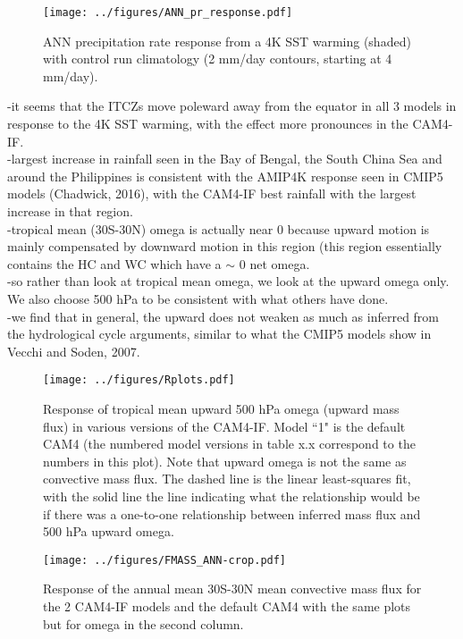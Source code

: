 \documentclass[letterpaper,12pt,titlepage,oneside,final]{book}
\begin{document}
\begin{figure}[H]
\centering
\noindent\texttt{[image: ../figures/ANN\_pr\_response.pdf]}\hfill
\caption{ANN precipitation rate response from a 4K SST warming (shaded) with control run climatology (2 mm/day contours, starting at 4 mm/day).}
\end{figure}
-it seems that the ITCZs move poleward away from the equator in all 3 models in response to the 4K SST warming, with the effect more pronounces in the CAM4-IF.
\\
-largest increase in rainfall seen in the Bay of Bengal, the South China Sea and around the Philippines is consistent with the AMIP4K response seen in CMIP5 models (Chadwick, 2016), with the CAM4-IF best rainfall with the largest increase in that region.
\\
-tropical mean (30S-30N) omega is actually near 0 because upward motion is mainly compensated by downward motion in this region (this region essentially contains the HC and WC which have a $\sim$ 0 net omega.
\\
-so rather than look at tropical mean omega, we look at the upward omega only. We also choose 500 hPa to be consistent with what others have done.
\\
-we find that in general, the upward does not weaken as much as inferred from the hydrological cycle arguments, similar to what the CMIP5 models show in Vecchi and Soden, 2007.
\begin{figure}[H]
\centering
\noindent\texttt{[image: ../figures/Rplots.pdf]}\hfill
\caption{Response of tropical mean upward 500 hPa omega (upward mass flux) in various versions of the CAM4-IF. Model ``1" is the default CAM4 (the numbered model versions in table x.x correspond to the numbers in this plot). Note that upward omega is not the same as convective mass flux. The dashed line is the linear least-squares fit, with the solid line the line indicating what the relationship would be if there was a  one-to-one relationship between inferred mass flux and 500 hPa upward omega.}
\end{figure}
\newpage
\begin{figure}[H]
\centering
\noindent\texttt{[image: ../figures/FMASS\_ANN-crop.pdf]}\hfill
\caption{Response of the annual mean 30S-30N mean convective mass flux for the 2 CAM4-IF models and the default CAM4 with the same plots but for omega in the second column.}
\end{figure}
\end{document}
